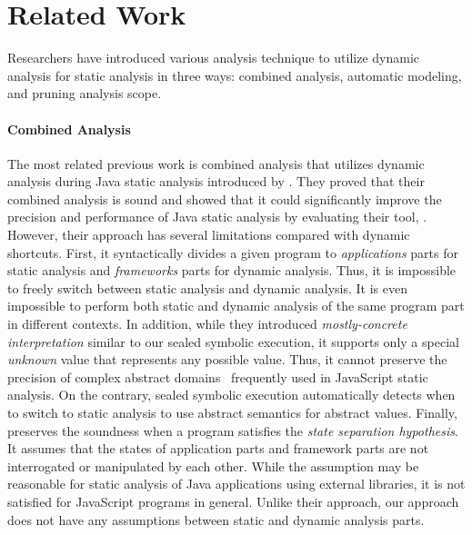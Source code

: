 \section{Related Work}\label{sec:related}
Researchers have introduced various analysis technique to utilize dynamic
analysis for static analysis in three ways: combined analysis,
automatic modeling, and pruning analysis scope.


\paragraph{Combined Analysis}
The most related previous work is combined analysis that utilizes dynamic
analysis during Java static analysis introduced by \citet{concerto}.
They proved that their combined analysis is sound and showed that it could
significantly improve the precision and performance of Java static analysis by
evaluating their tool, \concerto.  However, their approach has several
limitations compared with dynamic shortcuts.  First, it syntactically
divides a given program to \textit{applications} parts for static
analysis and \textit{frameworks} parts for dynamic analysis.  Thus, it is impossible to
freely switch between static analysis and dynamic analysis.  It is
even impossible to perform both static and dynamic analysis of 
the same program part in different contexts.  In addition, while they
introduced \textit{mostly-concrete interpretation} similar to our
sealed symbolic execution, it supports only a special \textit{unknown}
value that represents any possible value.  Thus, it cannot preserve
the precision of complex abstract domains~\cite{revisit-recency,
  regex, weaklySPE} frequently used in JavaScript static analysis.
On the contrary, sealed symbolic execution automatically detects when
to switch to static analysis to use abstract semantics for abstract values.
Finally, \concerto preserves the soundness when a program satisfies
the \textit{state separation hypothesis}.  It assumes that the states
of application parts and framework parts are not interrogated
or manipulated by each other.  While the assumption may be reasonable
for static analysis of Java applications using external libraries, it
is not satisfied for JavaScript programs in general.  Unlike their
approach, our approach does not have any assumptions between static and
dynamic analysis parts.


